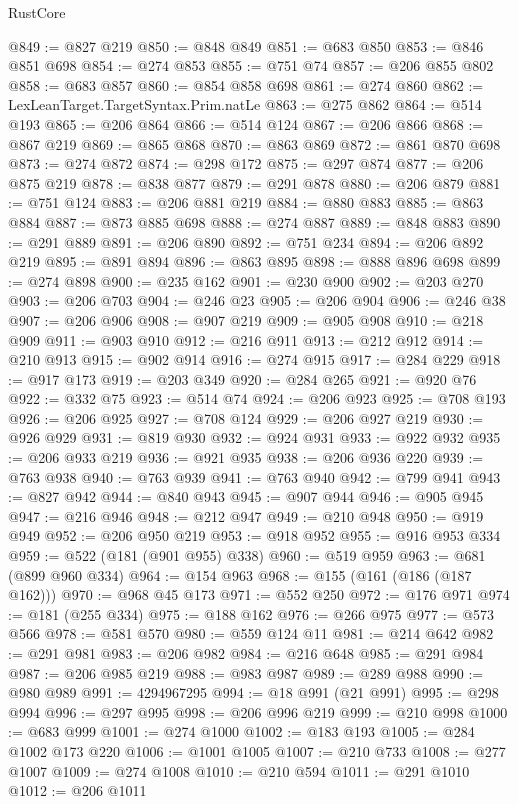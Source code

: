 \begin{lexlean}{RustCore}
\begin{coremodule}
@849 := @827 @219
@850 := @848 @849
@851 := @683 @850
@853 := @846 @851 @698
@854 := @274 @853
@855 := @751 @74
@857 := @206 @855 @802
@858 := @683 @857
@860 := @854 @858 @698
@861 := @274 @860
@862 := LexLeanTarget.TargetSyntax.Prim.natLe
@863 := @275 @862
@864 := @514 @193
@865 := @206 @864
@866 := @514 @124
@867 := @206 @866
@868 := @867 @219
@869 := @865 @868
@870 := @863 @869
@872 := @861 @870 @698
@873 := @274 @872
@874 := @298 @172
@875 := @297 @874
@877 := @206 @875 @219
@878 := @838 @877
@879 := @291 @878
@880 := @206 @879
@881 := @751 @124
@883 := @206 @881 @219
@884 := @880 @883
@885 := @863 @884
@887 := @873 @885 @698
@888 := @274 @887
@889 := @848 @883
@890 := @291 @889
@891 := @206 @890
@892 := @751 @234
@894 := @206 @892 @219
@895 := @891 @894
@896 := @863 @895
@898 := @888 @896 @698
@899 := @274 @898
@900 := @235 @162
@901 := @230 @900
@902 := @203 @270
@903 := @206 @703
@904 := @246 @23
@905 := @206 @904
@906 := @246 @38
@907 := @206 @906
@908 := @907 @219
@909 := @905 @908
@910 := @218 @909
@911 := @903 @910
@912 := @216 @911
@913 := @212 @912
@914 := @210 @913
@915 := @902 @914
@916 := @274 @915
@917 := @284 @229
@918 := @917 @173
@919 := @203 @349
@920 := @284 @265
@921 := @920 @76
@922 := @332 @75
@923 := @514 @74
@924 := @206 @923
@925 := @708 @193
@926 := @206 @925
@927 := @708 @124
@929 := @206 @927 @219
@930 := @926 @929
@931 := @819 @930
@932 := @924 @931
@933 := @922 @932
@935 := @206 @933 @219
@936 := @921 @935
@938 := @206 @936 @220
@939 := @763 @938
@940 := @763 @939
@941 := @763 @940
@942 := @799 @941
@943 := @827 @942
@944 := @840 @943
@945 := @907 @944
@946 := @905 @945
@947 := @216 @946
@948 := @212 @947
@949 := @210 @948
@950 := @919 @949
@952 := @206 @950 @219
@953 := @918 @952
@955 := @916 @953 @334
@959 := @522 (@181 (@901 @955) @338)
@960 := @519 @959
@963 := @681 (@899 @960 @334)
@964 := @154 @963
@968 := @155 (@161 (@186 (@187 @162)))
@970 := @968 @45 @173
@971 := @552 @250
@972 := @176 @971
@974 := @181 (@255 @334)
@975 := @188 @162
@976 := @266 @975
@977 := @573 @566
@978 := @581 @570
@980 := @559 @124 @11
@981 := @214 @642
@982 := @291 @981
@983 := @206 @982
@984 := @216 @648
@985 := @291 @984
@987 := @206 @985 @219
@988 := @983 @987
@989 := @289 @988
@990 := @980 @989
@991 := 4294967295
@994 := @18 @991 (@21 @991)
@995 := @298 @994
@996 := @297 @995
@998 := @206 @996 @219
@999 := @210 @998
@1000 := @683 @999
@1001 := @274 @1000
@1002 := @183 @193
@1005 := @284 @1002 @173 @220
@1006 := @1001 @1005
@1007 := @210 @733
@1008 := @277 @1007
@1009 := @274 @1008
@1010 := @210 @594
@1011 := @291 @1010
@1012 := @206 @1011

\end{coremodule}
\end{lexlean}
